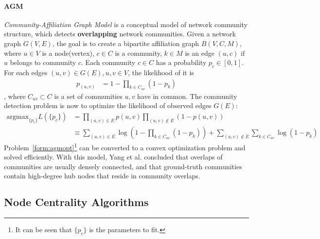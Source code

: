 \paragraph{AGM} \textit{Community-Affiliation Graph Model}\citep{yang2012structure}
is a conceptual model of network community structure, which detects 
\textbf{overlapping} network communities. Given a network graph $G(V,E)$, the
goal is to create a bipartite affiliation graph $B(V, C, M)$, where
$u\in V$ is a node(vertex), $c\in C$ is a community, 
$k\in M$ is an edge $(u,c)$ if $u$ belongs to community $c$. Each
community $c\in C$ has a probability $p_c\in [0,1]$.
For each edges $(u,v)\in G(E), u,v \in V$, the likelihood of it is 
\begin{align}
    p_(u,v) &= 1- \prod_{k\in C_{uv}}(1-p_k)
\end{align},
where $C_{uv}\subset C$ is a set of communities $u,v$ have in common.
The community detection problem is now to optimize the likelihood of 
observed edges $G(E)$: 
\begin{align} \label{form:agmopt}
    \text{argmax}_{\{p_c\}} L(\{p_c\}) &= \prod_{(u,v)\in E} p(u,v) 
        \prod_{(u,v)\notin E} (1 - p(u,v))\\
    &\equiv \sum_{(u,v)\in E}\log{(1 - \prod_{k\in C_{uv}} (1-p_k))} + 
        \sum_{(u,v)\notin E}\sum_{k\in C_{uv}} \log{(1-p_k)}
\end{align}
Problem~\ref{form:agmopt}\footnote{It can be seen that $\{p_c\}$ is the parameters to fit.}
can be converted to a convex optimization 
problem and solved efficiently\citep{yang2012structure}. 
With this model, Yang et al.\citep{yang2012structure} concluded that overlaps of communities are
usually densely connected, and that ground-truth communities contain
high-degree hub nodes that reside in community overlaps.

\subsection{Node Centrality Algorithms}
\label{sec:centrality}

